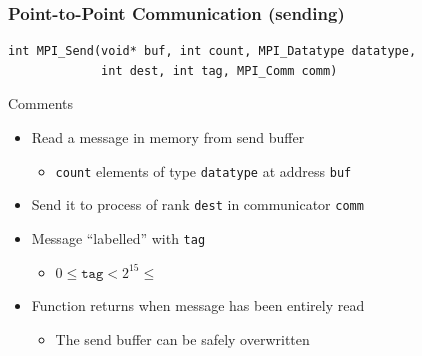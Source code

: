 \documentclass[xcolor={x11names,svgnames,psnames}]{beamer}
\begin{document}
\begin{frame}[fragile=singleslide]
  \frametitle{Point-to-Point Communication (sending)}

\begin{verbatim}
int MPI_Send(void* buf, int count, MPI_Datatype datatype,
             int dest, int tag, MPI_Comm comm)
\end{verbatim}

  \begin{block}{Comments}
    \begin{itemize}
    \item Read a message in memory from \alert{send buffer}
      \begin{itemize}
      \item \texttt{count} elements of type \texttt{datatype} at address \texttt{buf}      
      \end{itemize}
    \item Send it to process of rank \texttt{dest} in communicator \texttt{comm}
    \item Message ``labelled'' with \texttt{tag}
      \begin{itemize}
      \item $0 \leq \texttt{tag} < 2^{15} \leq $
      \end{itemize}
    \item Function returns when message has been entirely read
      \begin{itemize}
      \item The send buffer can be safely overwritten
      \end{itemize}
    \end{itemize}
  \end{block}
\end{frame}

\end{document}
